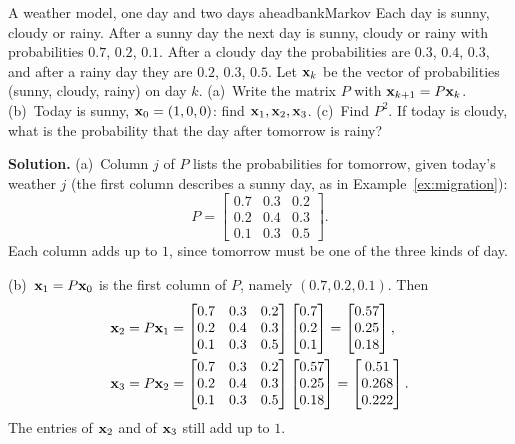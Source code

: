\documentclass[11pt]{article}
\begin{document}
\begin{exmp}{A weather model, one day and two days ahead}{bankMarkov}
Each day is sunny, cloudy or rainy. After a sunny day the next day is sunny, cloudy or rainy with probabilities $0.7$, $0.2$, $0.1$. After a cloudy day the probabilities are $0.3$, $0.4$, $0.3$, and after a rainy day they are $0.2$, $0.3$, $0.5$. Let $\mathbf{x}_k$ be the vector of probabilities (sunny, cloudy, rainy) on day $k$. (a)~Write the matrix $P$ with $\mathbf{x}_{k+1}=P\mathbf{x}_k$. (b)~Today is sunny, $\mathbf{x}_0=(1,0,0)$: find $\mathbf{x}_1,\mathbf{x}_2,\mathbf{x}_3$. (c)~Find $P^2$. If today is cloudy, what is the probability that the day after tomorrow is rainy?

\textbf{Solution.} (a)~Column $j$ of $P$ lists the probabilities for tomorrow, given today's weather $j$ (the first column describes a sunny day, as in Example~\ref{ex:migration}):
\[
P=\begin{bmatrix}0.7&0.3&0.2\\0.2&0.4&0.3\\0.1&0.3&0.5\end{bmatrix}.
\]
Each column adds up to $1$, since tomorrow must be one of the three kinds of day.

(b)~$\mathbf{x}_1=P\mathbf{x}_0$ is the first column of $P$, namely $(0.7,0.2,0.1)$. Then
\begin{align*}
&\mathbf{x}_2=P\mathbf{x}_1=\begin{bmatrix}0.7&0.3&0.2\\0.2&0.4&0.3\\0.1&0.3&0.5\end{bmatrix}\begin{bmatrix}0.7\\0.2\\0.1\end{bmatrix}=\begin{bmatrix}0.57\\0.25\\0.18\end{bmatrix},\\
&\mathbf{x}_3=P\mathbf{x}_2=\begin{bmatrix}0.7&0.3&0.2\\0.2&0.4&0.3\\0.1&0.3&0.5\end{bmatrix}\begin{bmatrix}0.57\\0.25\\0.18\end{bmatrix}=\begin{bmatrix}0.51\\0.268\\0.222\end{bmatrix}.
\end{align*}
The entries of $\mathbf{x}_2$ and of $\mathbf{x}_3$ still add up to $1$.


\end{exmp}
\end{document}
